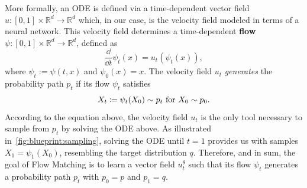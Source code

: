 \documentclass{fairmeta}
\newcommand{\highlight}[1]{{\color{metablue} \textbf{#1}}}
\numberwithin{equation}{section}
\begin{document}
More formally, an ODE is defined via a time-dependent vector field $u: [0,1] \times \mathbb{R}^d \to \mathbb{R}^d$ which, in our case, is the velocity field modeled in terms of a neural network. 
This velocity field determines a time-dependent \highlight{flow} $\psi : [0,1] \times \mathbb{R}^d \to \mathbb{R}^d$, defined as 
\begin{equation*}
  \frac{\dd}{\dd t} \psi_t(x) = u_t(\psi_t(x)), 
\end{equation*}
where $\psi_t := \psi(t, x)$ and $\psi_0(x) = x$.
The velocity field $u_t$ \emph{generates} the probability path $p_t$ if its flow $\psi_t$ satisfies 
\begin{equation}
 X_t \coloneqq \psi_t(X_0) \sim p_t \text{ for } X_0 \sim p_0.
\end{equation}
According to the equation above, the velocity field $u_t$ is the only tool necessary to sample from $p_t$ by solving the ODE above. 
As illustrated in~\cref{fig:blueprint:sampling}, solving the ODE until $t=1$ provides us with samples $X_1=\psi_1(X_0)$, resembling the target distribution $q$.
Therefore, and in sum, the goal of Flow Matching is to learn a vector field $u^\theta_t$ such that its flow $\psi_t$ generates a probability path $p_t$ with $p_0=p$ and $p_1=q$.
\end{document}
